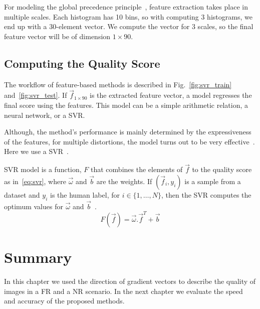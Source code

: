 For modeling the global precedence principle~\cite{Hughes1996}, feature extraction takes place in multiple scales. Each histogram has 10 bins, so with computing 3 histograms, we end up with a 30-element vector. We compute the vector for 3 scales, so the final feature vector will be of dimension $1\times 90$.
\subsection{Computing the Quality Score}
The workflow of feature-based methods is described in Fig.~\ref{fig:svr_train} and~\ref{fig:svr_test}. If $\Vec{f}_{1\times 90}$ is the extracted feature vector, a model regresses the final score using the features. This model can be a simple arithmetic relation, a neural network, or a SVR.

Although, the method's performance is mainly determined by the expressiveness of the features, for multiple distortions, the model turns out to be very effective~\cite{Dai2018, Yue2018, Zhou2019}. Here we use a SVR~\cite{smola2004tutorial}.

SVR model is a function, $F$ that combines the elements of $\Vec{f}$ to the quality score as in~\ref{eq:svr}, where $\Vec{\omega}$ and $\Vec{b}$ are the weights. If $(\Vec{f}_i, y_i)$ is a sample from a dataset and $y_i$ is the human label, for $i\in \{1, \ldots, N\}$, then the SVR computes the optimum values for $\Vec{\omega}$ and $\Vec{b}$~\cite{chang2011libsvm}.
\begin{equation}
    F(\Vec{f}) = \Vec{\omega}.\Vec{f}^T+\Vec{b}
    \label{eq:svr}
\end{equation}
\section{Summary}
In this chapter we used the direction of gradient vectors to describe the quality of images in a FR and a NR scenario. In the next chapter we evaluate the speed and accuracy of the proposed methods.
